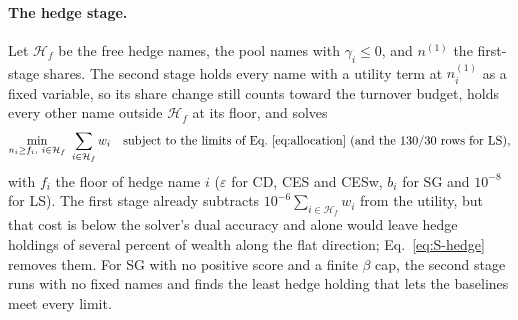 \paragraph{The hedge stage.}
Let $\mathcal{H}_f$ be the free hedge names, the pool names with $\gamma_i \le 0$, and $n^{(1)}$ the first-stage
shares. The second stage holds every name with a utility term at $n_i^{(1)}$ as a fixed variable, so its share
change still counts toward the turnover budget, holds every other name outside $\mathcal{H}_f$ at its floor, and
solves
\begin{equation}
\min_{n_i \ge f_i,\ i \in \mathcal{H}_f} \ \sum_{i \in \mathcal{H}_f} w_i
\quad \text{subject to the limits of Eq.~\ref{eq:allocation} (and the 130/30 rows for LS)},
\label{eq:S-hedge}
\end{equation}
with $f_i$ the floor of hedge name $i$ ($\varepsilon$ for CD, CES and CESw, $b_i$ for SG and $10^{-8}$ for LS). The
first stage already subtracts $10^{-6} \sum_{i \in \mathcal{H}_f} w_i$ from the utility, but that cost is below the
solver's dual accuracy and alone would leave hedge holdings of several percent of wealth along the flat direction;
Eq.~\ref{eq:S-hedge} removes them. For SG with no positive score and a finite $\beta$ cap, the second stage runs
with no fixed names and finds the least hedge holding that lets the baselines meet every limit.

